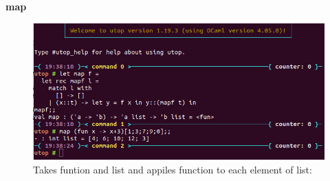 \documentclass[15]{article}
\begin{document}
\textbf{map}
\begin{figure}

\includegraphics[scale = .5]{images/image4.png}
Takes funtion and list and appiles function to each element of list:
\\
\\


\end{figure}
\end{document}
